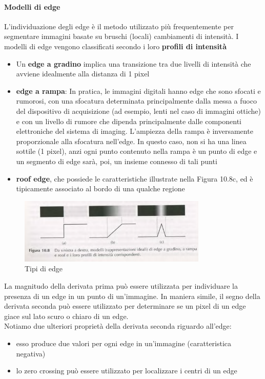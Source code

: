\documentclass[12pt]{article}
\begin{document}
\paragraph{Modelli di edge} L'individuazione degli edge è il metodo utilizzato più frequentemente per segmentare
immagini basate su bruschi (locali) cambiamenti di intensità. I modelli di edge vengono classificati secondo i loro \textbf{profili di intensità}
\begin{itemize}
    \item Un \textbf{edge a gradino} implica una transizione tra due livelli di intensità che avviene idealmente alla distanza di 1 pixel
    \item \textbf{edge a rampa}: In pratica, le immagini digitali hanno edge che sono sfocati e rumorosi, con una sfocatura determinata principalmente dalla messa a fuoco del dispositivo di acquisizione (ad esempio, lenti nel caso di immagini ottiche) e con un livello di rumore che dipenda principalmente dalle componenti elettroniche del sistema di imaging. L'ampiezza della rampa è inversamente proporzionale alla sfocatura nell'edge. In questo caso, non si ha una linea sottile (1 pixel), anzi ogni punto contenuto nella rampa è un punto di edge e un segmento di edge sarà, poi, un insieme connesso di tali punti
    \item \textbf{roof edge}, che possiede le caratteristiche illustrate nella Figura 10.8c, ed è tipicamente associato al bordo di una qualche regione
\end{itemize}
\begin{figure}[!htb]
    \centering
    \includegraphics[width=0.8\textwidth]{Images/edgetipi-png.png}
    \caption{Tipi di edge}
\end{figure}
\FloatBarrier
La magnitudo della derivata prima può essere utilizzata per individuare la presenza di un edge in un punto di un'immagine. In maniera simile, il segno della derivata seconda può essere utilizzato per determinare se
un pixel di un edge giace sul lato scuro o chiaro di un edge.
\\Notiamo due ulteriori proprietà della derivata seconda riguardo all'edge:
\begin{itemize}
    \item esso produce due valori per ogni edge in un'immagine (caratteristica negativa)
    \item lo zero crossing può essere utilizzato per localizzare i centri di un edge
\end{itemize}
\end{document}
